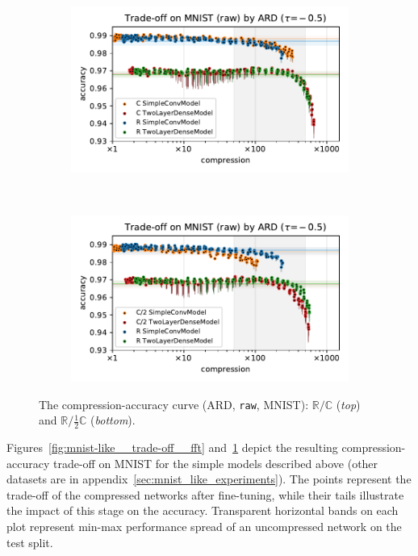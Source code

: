 \documentclass[a4paper,10pt,twocolumn]{article}
\newcommand{\real}{\mathbb{R}}
\newcommand{\cplx}{\mathbb{C}}
\begin{document}
\begin{figure}[!t]
  \centering
  \begin{subfigure}[b]{1.\columnwidth}  %
    \centering
    \includegraphics[width=\columnwidth]{figure__mnist-like__trade-off/appendix__ARD__mnist__raw__-0.5.pdf}
  \end{subfigure} \\%
  \begin{subfigure}[b]{1.\columnwidth}  %
    \centering
    \includegraphics[width=\columnwidth]{figure__mnist-like__trade-off/appendix__cmp__ARD__mnist__raw__-0.5.pdf}
  \end{subfigure}
  \caption{%
    The compression-accuracy curve (ARD, \texttt{raw}, MNIST):
    $\real / \cplx$ (\textit{top}) and $\real / \tfrac12 \cplx$ (\textit{bottom}).
  }
  \label{fig:mnist-like__trade-off__raw}
\end{figure}

Figures~\ref{fig:mnist-like__trade-off__fft} and~\ref{fig:mnist-like__trade-off__raw}
depict the resulting compression-accuracy trade-off on MNIST for the simple models
described above (other datasets are in appendix~\ref{sec:mnist_like_experiments}).
%
The points represent the trade-off of the compressed networks after fine-tuning, while their
tails illustrate the impact of this stage on the accuracy. Transparent horizontal bands on
each plot represent min-max performance spread of an uncompressed network on the test split.
\end{document}
